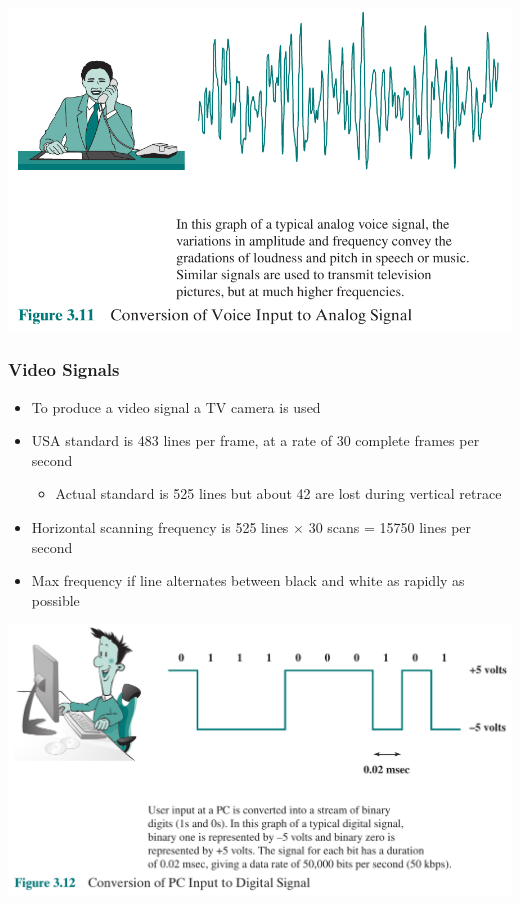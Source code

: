 \documentclass[pdflatex,compress]{beamer}
\begin{document}
\begin{frame}
	\begin{center}
		\includegraphics[width=0.9\linewidth]{img/img10}
	\end{center}
\end{frame}

\begin{frame}
	\frametitle{Video Signals}
	\begin{itemize}
		\item To produce a video signal a TV camera is used
		\item USA standard is 483 lines per frame, at a rate of 30 complete frames per second
		\begin{itemize}
			\item Actual standard is 525 lines but about 42 are lost during vertical retrace
		\end{itemize}
		\item  Horizontal scanning frequency is 525 lines $ \times $ 30 scans = 15750 lines per second
		\item Max frequency if line alternates between black and white as rapidly as possible
	\end{itemize}
\end{frame}

\begin{frame}
	\begin{center}
		\includegraphics[width=\linewidth]{img/img11}
	\end{center}
\end{frame}
\end{document}
